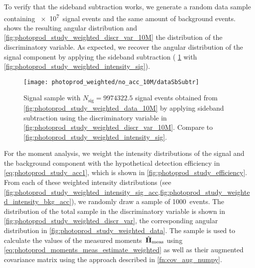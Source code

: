 To verify that the sideband subtraction works, we generate a random
data sample containing \num{e7}~signal events and the same amount of
background events.   shows
the resulting angular distribution and
\cref{fig:photoprod_study_weighted_discr_var_10M}  the distribution of
the discriminatory variable.  As expected, we recover the angular
distribution of the signal component by applying the sideband
subtraction (\confer
\cref{fig:photoprod_study_weighted_data_sb_subtr_10M} with
\cref{fig:photoprod_study_weighted_intensity_sig}).

\begin{figure}[tbp]
  \centering%
  \texttt{[image: photoprod\_weighted/no\_acc\_10M/dataSbSubtr]}%
  \caption{Signal sample with $N_\text{sig} = \num{9974322.5}$ signal
  events obtained from \cref{fig:photoprod_study_weighted_data_10M} by
  applying sideband subtraction using the discriminatory variable in
  \cref{fig:photoprod_study_weighted_discr_var_10M}.  Compare to
  \cref{fig:photoprod_study_weighted_intensity_sig}.}%
  \label{fig:photoprod_study_weighted_data_sb_subtr_10M}%
\end{figure}

For the moment analysis, we weight the intensity distributions of the
signal and the background component with the hypothetical detection
efficiency in \cref{eq:photoprod_study_acc1}, which is shown in
\cref{fig:photoprod_study_efficiency}.  From each of these weighted
intensity distributions (see
\cref{fig:photoprod_study_weighted_intensity_sig_acc,fig:photoprod_study_weighted_intensity_bkg_acc}),
we randomly draw a sample of \num{1000}~events.  The distribution of
the total sample in the discriminatory variable is shown in
\cref{fig:photoprod_study_weighted_discr_var}, the corresponding
angular distribution in \cref{fig:photoprod_study_weighted_data}.  The
sample is used to calculate the values of the measured
moments~$\hat{\bm{\mathrm{H}}}_\text{meas}$ using
\cref{eq:photoprod_moments_meas_estimate_weighted} as well as their
augmented covariance matrix using the approach described in
\cref{fn:cov_aug_numpy}.

